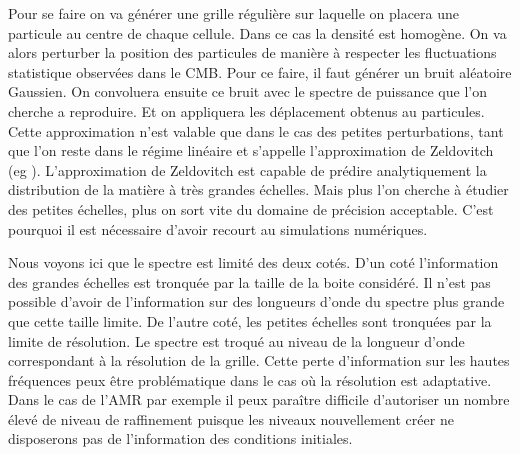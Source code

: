 Pour se faire on va générer une grille régulière sur laquelle on placera une particule au centre de chaque cellule.
Dans ce cas la densité est homogène.
On va alors perturber la position des particules de manière à respecter les fluctuations statistique observées dans le CMB.
Pour ce faire, il faut générer un bruit aléatoire Gaussien.
On convoluera ensuite ce bruit avec le spectre de puissance que l'on cherche a reproduire.
Et on appliquera les déplacement obtenus au particules.
Cette approximation n'est valable que dans le cas des petites perturbations, tant que l'on reste dans le régime linéaire et s'appelle l’approximation de Zeldovitch (eg \cite{2014MNRAS.439.3630W}).
L’approximation de Zeldovitch est capable de prédire analytiquement la distribution de la matière à très grandes échelles.
Mais plus l'on cherche à étudier des petites échelles, plus on sort vite du domaine de précision acceptable.
C'est pourquoi il est nécessaire d'avoir recourt au simulations numériques.

Nous voyons ici que le spectre est limité des deux cotés.
D'un coté l'information des grandes échelles est tronquée par la taille de la boite considéré.
Il n'est pas possible d'avoir de l’information sur des longueurs d'onde du spectre plus grande que cette taille limite.
De l'autre coté, les petites échelles sont tronquées par la limite de résolution.
Le spectre est troqué au niveau de la longueur d'onde correspondant à la résolution de la grille.
Cette perte d'information sur les hautes fréquences peux être problématique dans le cas où la résolution est adaptative.
Dans le cas de l'\ac{AMR} par exemple il peux paraître difficile d'autoriser un nombre élevé de niveau de raffinement puisque les niveaux nouvellement créer ne disposerons pas de l'information des conditions initiales.




%
%

